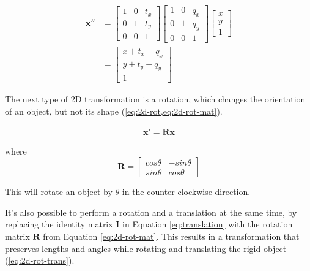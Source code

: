 \begin{equation}
    \begin{aligned}
        \mathbf{\bar{x}}'' &= \begin{bmatrix}
            1 & 0 & t_x \\ 0 & 1 & t_y \\ 0 & 0 & 1
        \end{bmatrix} 
        \begin{bmatrix}
            1 & 0 & q_x \\ 0 & 1 & q_y \\ 0 & 0 & 1
        \end{bmatrix} \begin{bmatrix}
            x \\ y \\ 1 
        \end{bmatrix}\\
        &= \begin{bmatrix}
            x + t_x + q_x \\ y + t_y + q_y \\ 1
        \end{bmatrix}
    \end{aligned}
    \label{eq:mult-translation}
\end{equation}

The next type of 2D transformation is a rotation, which changes the orientation of an object, but not its shape (\cref{eq:2d-rot,eq:2d-rot-mat}). 

\begin{equation}
    \begin{aligned}
        \mathbf{x}' = \mathbf{Rx}
    \end{aligned}
    \label{eq:2d-rot}
\end{equation}

where
\begin{equation}
    \mathbf{R} = \begin{bmatrix}
        cos\theta & -sin \theta \\ sin \theta & cos \theta 
    \end{bmatrix}
    \label{eq:2d-rot-mat}
\end{equation}

This will rotate an object by $\theta$ in the counter clockwise direction. 

It's also possible to perform a rotation and a translation at the same time, by replacing the identity matrix $\mathbf{I}$ in Equation \ref{eq:translation} with the rotation matrix $\mathbf{R}$ from Equation \ref{eq:2d-rot-mat}. This results in a transformation that preserves lengths and angles while rotating and translating the rigid object (\cref{eq:2d-rot-trans}).

